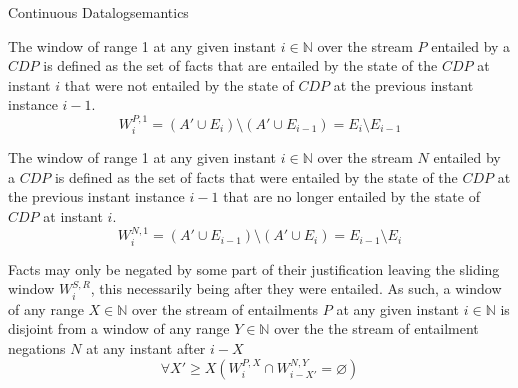 \begin{nestedsection}{Continuous Datalog}{semantics}
	\begin{axiom}\label{axiom:continuous datalog: positive window increment}
		The window of range 1 at any given instant ${i \in \mathbb{N}}$ over the stream $P$ entailed by a ${CDP}$ is defined as the set of facts that are entailed by the state of the ${CDP}$ at instant $i$ that were not entailed by the state of ${CDP}$ at the previous instant instance ${i-1}$.
		\begin{equation*}
			W^{P,1}_{i} = \left( A' \cup E_{i} \right) \setminus \left( A' \cup E_{i-1} \right) = E_{i} \setminus E_{i-1}
		\end{equation*}
	\end{axiom}

	\begin{axiom}\label{axiom:continuous datalog: negative window increment}
		The window of range 1 at any given instant ${i \in \mathbb{N}}$ over the stream $N$ entailed by a ${CDP}$ is defined as the set of facts that were entailed by the state of the ${CDP}$ at the previous instant instance ${i-1}$ that are no longer entailed by the state of ${CDP}$ at instant $i$.
		\begin{equation*}
			W^{N,1}_{i} = \left( A' \cup E_{i-1} \right) \setminus \left( A' \cup E_{i} \right) = E_{i-1} \setminus E_{i}
		\end{equation*}
	\end{axiom}

	\begin{axiom}\label{axiom:continuous datalog: entailment precedes negation}
		Facts may only be negated by some part of their justification leaving the sliding window $W^{S,R}_{i}$, this necessarily being after they were entailed.
		As such, a window of any range ${X \in \mathbb{N}}$ over the stream of entailments $P$ at any given instant ${i \in \mathbb{N}}$ is disjoint from a window of any range ${Y \in \mathbb{N}}$ over the the stream of entailment negations $N$ at any instant after ${i - X}$
		\begin{equation*}
			\forall X' \geq X \left( W^{P,X}_{i} \cap W^{N,Y}_{i-X'} = \varnothing \right)
		\end{equation*}
	\end{axiom}


\end{nestedsection}
